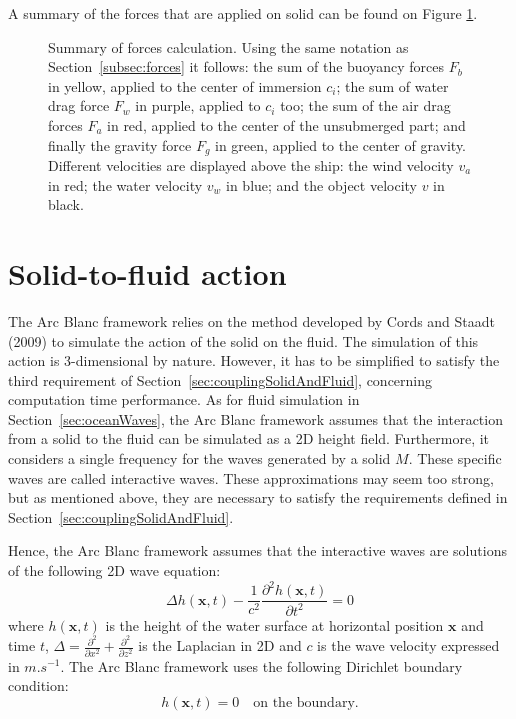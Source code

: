\documentclass[final]{jcgt}
\def\Framework{The Arc Blanc framework\xspace}
\def\framework{the Arc Blanc framework\xspace}
\begin{document}
A summary of the forces that are applied on solid can be found on Figure \ref{fig:forcesComputation}.

\begin{figure}[!h]
	\centering
	
	\caption{Summary of forces calculation. Using the same notation as Section~\ref{subsec:forces} it follows:
		the sum of the buoyancy forces \textcolor{jauneC}{$F_b$} in \textcolor{jauneC}{yellow}, applied to the center of immersion $c_i$;
		the sum of water drag force \textcolor{purpleF}{$F_w$} in \textcolor{purpleF}{purple}, applied to $c_i$ too;
		the sum of the air drag forces \textcolor{redF}{$F_a$} in \textcolor{redF}{red}, applied to the center of the unsubmerged part;
		and finally the gravity force \textcolor{greenF}{$F_g$} in \textcolor{greenF}{green}, applied to the center of gravity.
		Different velocities are displayed above the ship:
		the wind velocity \textcolor{redF}{$v_a$} in \textcolor{redF}{red};
		the water velocity \textcolor{bleuF}{$v_w$} in \textcolor{bleuF}{blue};
		and the object velocity \textcolor{noirC}{$v$} in \textcolor{noirC}{black}.}
	\label{fig:forcesComputation}
\end{figure}

\section{Solid-to-fluid action}
\label{sec:solidToFluidAction}
\Framework relies on the method developed by Cords and Staadt (2009) \cite{cordsRealTimeOpenWater2009} to simulate the action of the solid on the fluid.
The simulation of this action is 3-dimensional by nature.
However, it has to be simplified to satisfy the third requirement of Section~\ref{sec:couplingSolidAndFluid}, concerning computation time performance.
As for fluid simulation in Section~\ref{sec:oceanWaves}, \framework assumes that the interaction from a solid to the fluid can be simulated as a 2D height field.
Furthermore, it considers a single frequency for the waves generated by a solid $M$.
These specific waves are called interactive waves.
These approximations may seem too strong, but as mentioned above, they are necessary to satisfy the requirements defined in Section~\ref{sec:couplingSolidAndFluid}.

Hence, \framework assumes that the interactive waves are solutions of the following 2D wave equation:
\begin{equation}
	\label{eq:2dwave}
	\Delta h(\mathbf x,t)-\frac{1}{c^2}\frac{\partial^2 h(\mathbf x,t)}{\partial t^2}=0
\end{equation}
where $h(\mathbf x,t)$ is the height of the water surface at horizontal position $\mathbf x$ and time $t$, $\Delta=\frac{\partial^2}{\partial x^2}+\frac{\partial^2}{\partial z^2}$ is the Laplacian in 2D and $c$ is the wave velocity expressed in $m.s^{-1}$.
\Framework uses the following Dirichlet boundary condition:
\begin{equation}
	h(\mathbf x,t) = 0 \text{~~~on the boundary.}
\end{equation}
\end{document}
